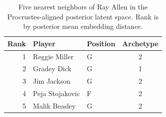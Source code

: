 \begin{table}[htbp]
  \centering\small
  \begin{tabular}{rllc}
    \toprule
    Rank & Player & Position & Archetype \\
    \midrule
    1 & Reggie Miller & G & 2 \\
    2 & Gradey Dick & G & 1 \\
    3 & Jim Jackson & G & 2 \\
    4 & Peja Stojakovic & F & 2 \\
    5 & Malik Beasley & G & 2 \\
    \bottomrule
  \end{tabular}
  \caption{Five nearest neighbors of Ray Allen in the Procrustes-aligned posterior latent space. Rank is by posterior mean embedding distance.}
  \label{tab:Ray_Allen_neighbors}
\end{table}

